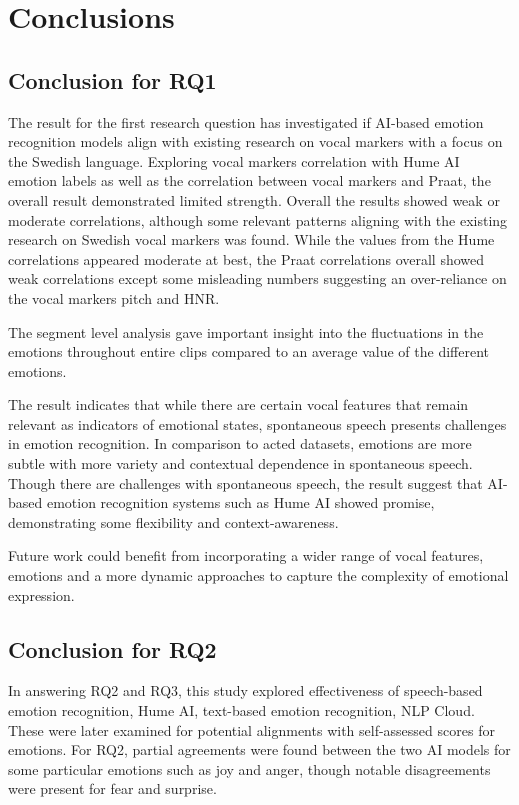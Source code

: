 \section{Conclusions}
\subsection{Conclusion for RQ1}
The result for the first research question has investigated if AI-based emotion recognition models align with existing research on vocal markers with a focus on the Swedish language.
Exploring vocal markers correlation with Hume AI emotion labels as well as the correlation between vocal markers and Praat, the overall result demonstrated limited strength.
Overall the results showed weak or moderate correlations, although some relevant patterns aligning with the existing research on Swedish vocal markers \autocite{Ekberg2023} was found.
While the values from the Hume correlations appeared moderate at best, the Praat correlations overall showed weak correlations except some misleading numbers suggesting an over-reliance on the vocal markers pitch and HNR.

The segment level analysis gave important insight into the fluctuations in the emotions throughout entire clips compared to an average value of the different emotions.

The result indicates that while there are certain vocal features that remain relevant as indicators of emotional states, spontaneous speech presents challenges in emotion recognition. In comparison to acted datasets, emotions are more subtle with more variety and contextual dependence in spontaneous speech.
Though there are challenges with spontaneous speech, the result suggest that AI-based emotion recognition systems such as Hume AI showed promise, demonstrating some flexibility and context-awareness.

Future work could benefit from incorporating a wider range of vocal features, emotions and a more dynamic approaches to capture the complexity of emotional expression.

\subsection{Conclusion for RQ2}
In answering RQ2 and RQ3, this study explored effectiveness of speech-based emotion recognition, Hume AI, text-based emotion recognition, NLP Cloud. These were later examined for potential alignments with self-assessed scores for emotions.
For RQ2, partial agreements were found between the two AI models for some particular emotions such as joy and anger, though notable disagreements were present for fear and surprise. 

